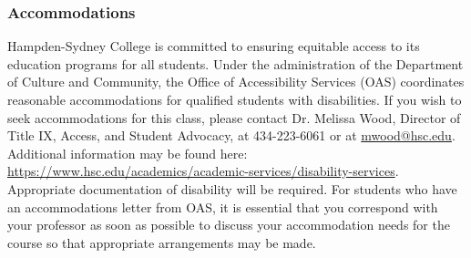 \documentclass[10pt]{article}
\begin{document}
\subsubsection*{Accommodations}

Hampden-Sydney College is committed to ensuring equitable access to its education programs for all students. Under the administration of the Department of Culture and Community, the Office of Accessibility Services (OAS) coordinates reasonable accommodations for qualified students with disabilities. If you wish to seek accommodations for this class, please contact Dr. Melissa Wood, Director of Title IX, Access, and Student Advocacy, at 434-223-6061 or at \url{mwood@hsc.edu}. Additional information may be found here: \url{https://www.hsc.edu/academics/academic-services/disability-services}. Appropriate documentation of disability will be required. For students who have an accommodations letter from OAS, it is essential that you correspond with your professor as soon as possible to discuss your accommodation needs for the course so that appropriate arrangements may be made. 
\end{document}
